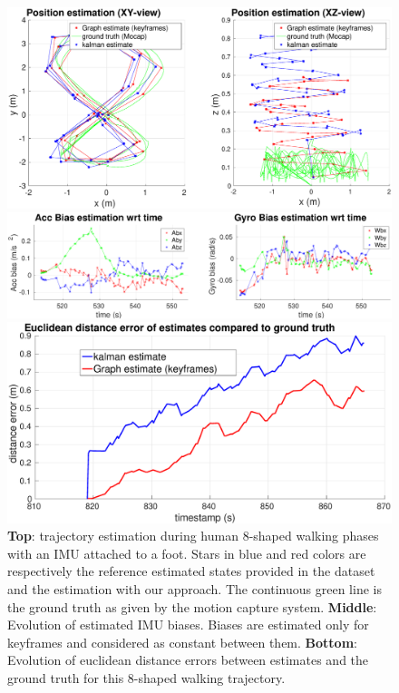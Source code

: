 \begin{figure}[tb]
\centering
\includegraphics[scale=0.175]{figures/experiments/8shape/XY_XZ_viewsRotated2.eps}
\par\vspace{3mm}
\includegraphics[scale=0.175]{figures/experiments/8shape/bias.eps}
\par\vspace{3mm}
\includegraphics[scale=0.150]{figures/experiments/8shape/euclidean_err.eps}
\caption{ 
{\bf Top}: trajectory estimation during human 8-shaped walking phases with an IMU attached to a foot. Stars in blue and red colors are respectively the reference estimated states provided in the dataset and the estimation with our approach.
The continuous green line is the ground truth as given by the motion capture system.
{\bf Middle}: Evolution of estimated IMU biases. Biases are estimated only for keyframes and considered as constant between them.
{\bf Bottom}: Evolution of euclidean distance errors between estimates and the ground truth for this 8-shaped walking trajectory.
}
\label{fig:8shape_walk}
\end{figure}

